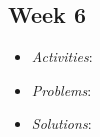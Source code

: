\documentclass[compsoc,draftclsnofoot,onecolumn,10pt]{IEEEtran}
\begin{document}
\subsection{Week 6}
	\begin{itemize}
        \item \textit{Activities}:\\


        \item \textit{Problems}:\\


        \item \textit{Solutions}:\\


	\end{itemize}
   
\end{document}
